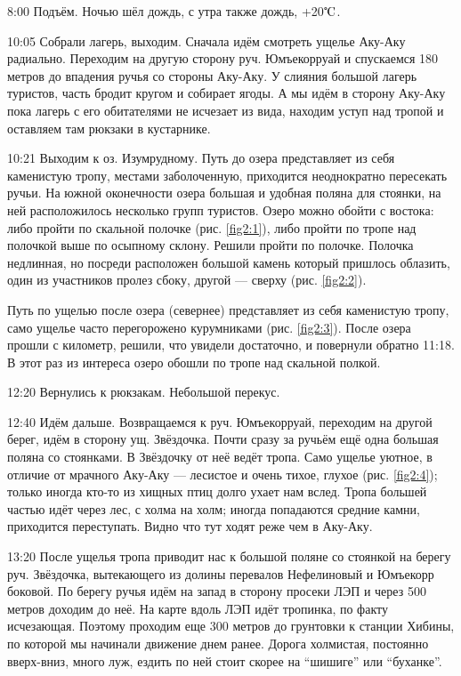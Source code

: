 8:00 Подъём.
Ночью шёл дождь, с утра также дождь, +20$\tccentigrade$.

10:05 Собрали лагерь, выходим. Сначала идём смотреть ущелье Аку-Аку радиально.
Переходим на другую сторону руч. Юмъекорруай и спускаемся 180 метров до впадения ручья со стороны Аку-Аку.
У слияния большой лагерь туристов, часть бродит кругом и собирает ягоды. А мы идём в сторону Аку-Аку пока лагерь
с его обитателями не исчезает из вида, находим уступ над тропой и оставляем там рюкзаки в кустарнике.

10:21 Выходим к оз. Изумрудному. Путь до озера представляет из себя каменистую тропу, местами заболоченную,
приходится неоднократно пересекать ручьи. На южной оконечности озера большая и удобная поляна для стоянки,
на ней расположилось несколько групп туристов. Озеро можно обойти с востока: либо пройти по скальной полочке (рис. \ref{fig2:1}),
либо пройти по тропе над полочкой выше по осыпному склону. Решили пройти по полочке.
Полочка недлинная, но посреди расположен большой камень который пришлось облазить, один из участников пролез сбоку,
другой --- сверху (рис. \ref{fig2:2}).

Путь по ущелью после озера (севернее) представляет из себя каменистую тропу,
само ущелье часто перегорожено курумниками (рис. \ref{fig2:3}).
После озера прошли с километр, решили, что увидели достаточно, и повернули обратно 11:18.
В этот раз из интереса озеро обошли по тропе над скальной полкой.

12:20 Вернулись к рюкзакам. Небольшой перекус.

12:40 Идём дальше. Возвращаемся к руч. Юмъекорруай, переходим на другой берег, идём в сторону ущ. Звёздочка.
Почти сразу за ручьём ещё одна большая поляна со стоянками. В Звёздочку от неё ведёт тропа.
Само ущелье уютное, в отличие от мрачного Аку-Аку --- лесистое и очень тихое, глухое (рис. \ref{fig2:4});
только иногда кто-то из хищных птиц долго ухает нам вслед. Тропа большей частью идёт через лес, с холма на холм;
иногда попадаются средние камни, приходится переступать. Видно что тут ходят реже чем в Аку-Аку.

13:20 После ущелья тропа приводит нас к большой поляне со стоянкой на берегу руч.
Звёздочка, вытекающего из долины перевалов Нефелиновый и Юмъекорр боковой.
По берегу ручья идём на запад в сторону просеки ЛЭП и через 500 метров доходим до неё.
На карте вдоль ЛЭП идёт тропинка, по факту исчезающая. Поэтому проходим еще 300 метров до грунтовки к станции Хибины,
по которой мы начинали движение днем ранее. Дорога холмистая, постоянно вверх-вниз, много луж,
ездить по ней стоит скорее на \enquote{шишиге} или \enquote{буханке}.

